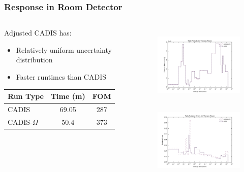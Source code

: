 \documentclass[xcolor=x11names,compress,handout]{beamer}
\renewcommand{\(}{\begin{columns}}
\renewcommand{\)}{\end{columns}}
\newcommand{\<}[1]{\begin{column}{#1}}
\renewcommand{\>}{\end{column}}
\begin{document}
\begin{frame}[fragile]
  \frametitle{Response in Room Detector}
  
\begin{columns}
  \begin{column}{0.45\textwidth}
  Adjusted CADIS has:
  \begin{itemize}
    \item Relatively uniform uncertainty distribution
    \item Faster runtimes than CADIS
  \end{itemize}
  \vspace*{.5em}
  \begin{tabular}{|l|c c|}
  \hline
      Run Type & Time (m) & FOM \\  
      \hline
      CADIS  & 69.05  &  287 \\
      CADIS-$\Omega$ & 50.4 & 373 \\
      \hline
  \end{tabular}
  \end{column}
  \begin{column}{0.55\textwidth}
  	\begin{figure}
  	\begin{center}
  		\includegraphics[height=1.5in,clip]{../figs/room-both-tally.png}\\
  		\includegraphics[height=1.5in,clip]{../figs/room-both-re.png}
	\end{center}
  	\end{figure}
  \end{column}
\end{columns}
\end{frame}
\end{document}
